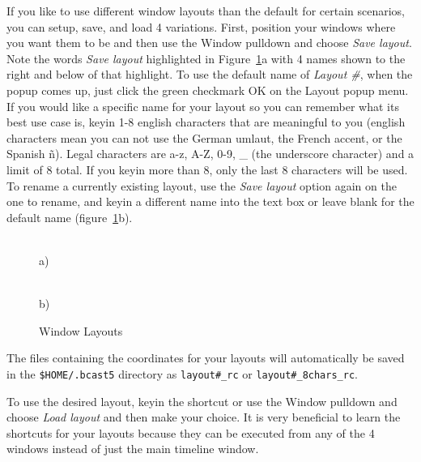 If you like to use different window layouts than the default for certain scenarios, you can setup, save, and load 4 variations.   
First, position your \CGG{} windows where you want them to be and then use the Window pulldown and choose \emph{Save layout}. Note the words \emph{Save layout} highlighted in Figure~\ref{fig:window_layouts}a with 4 names shown to the right and below of that highlight. 
To use the default name of \textit{Layout \#}, when the popup comes up, just click the green checkmark OK on the Layout popup menu.  
If you would like a specific name for your layout so you can remember what its best use case is,
keyin 1-8 english characters that are meaningful to you (english characters mean you can not use the German umlaut, the French accent, or the Spanish ñ). 
Legal characters are a-z, A-Z, 0-9, \_ (the underscore character) and a limit of 8 total.  
If you keyin more than 8, only the last 8 characters will be used.  
To rename a currently existing layout, use the \emph{Save layout} option again on the one to rename, and keyin a different name into the text box or leave blank for the default name (figure~\ref{fig:window_layouts}b).

\begin{figure}[htpb]
    \centering
    \begin{minipage}{.49\linewidth}
        \\ a)
    \end{minipage}
    \begin{minipage}{.49\linewidth}
        \vspace{13ex}
        \\ b)
    \end{minipage}
    \caption{Window Layouts}
    \label{fig:window_layouts}
\end{figure}

The files containing the coordinates for your layouts will automatically be saved in the \texttt{\$HOME/.bcast5} directory as \texttt{layout\#\_rc} or \texttt{layout\#\_8chars\_rc}.

To use the desired layout, keyin the shortcut or use the Window pulldown and choose \emph{Load layout} and then make your choice. It is very beneficial to learn the shortcuts for your
layouts because they can be executed from any of the 4 windows instead of just the main
timeline window.

